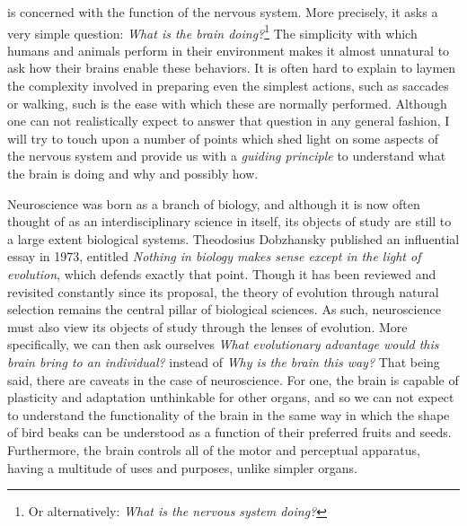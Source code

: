  is concerned with the function of the nervous system. More precisely, it asks a very simple question: {\em What is the brain doing?}\footnote{ Or alternatively: {\em What is the nervous system doing?}} The simplicity with which humans and animals perform in their environment makes it almost unnatural to ask how their brains enable these behaviors. It is often hard to explain to laymen the complexity involved in preparing even the simplest actions, such as saccades or walking, such is the ease with which these are normally performed. Although one can not realistically expect to answer that question in any general fashion, I will try to touch upon a number of points which shed light on some aspects of the nervous system and provide us with a {\em guiding principle} to understand what the brain is doing and why and possibly how.\par
Neuroscience was born as a branch of biology, and although it is now often thought of as  an interdisciplinary science in itself, its objects of study are still to a large extent biological systems. Theodosius Dobzhansky published an influential essay in 1973, entitled {\em Nothing in biology makes sense except in the light of evolution},\cite{Dobzhansky1973} which defends exactly that point. Though it has been reviewed and revisited constantly since its proposal, the theory of evolution through natural selection remains the central pillar of biological sciences. As such, neuroscience must also view its objects of study through the lenses of evolution. More specifically, we can then ask ourselves {\em What evolutionary advantage would this brain bring to an individual?} instead of {\em Why is the brain this way?} That being said,  there are caveats in the case of neuroscience. For one, the brain is capable of plasticity and adaptation unthinkable for other organs, and so we can not expect to understand the functionality of the brain in the same way in which the shape of bird beaks can be understood as a function of their preferred fruits and seeds. Furthermore, the brain controls all of the motor and perceptual apparatus, having a multitude of uses and purposes, unlike simpler organs.\par
